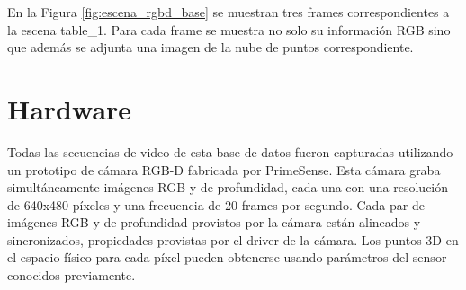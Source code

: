 En la Figura \ref{fig:escena_rgbd_base} se muestran tres frames correspondientes a la escena table\_1. Para cada frame se muestra no solo su información RGB sino que además se adjunta una imagen de la nube de puntos correspondiente.


\section{Hardware}
Todas las secuencias de video de esta base de datos fueron capturadas utilizando un prototipo de cámara RGB-D fabricada por PrimeSense. Esta cámara graba simultáneamente imágenes RGB y de profundidad, cada una con una resolución de 640x480 píxeles y una frecuencia de 20 frames por segundo. Cada par de imágenes RGB y de profundidad provistos por la cámara están alineados y sincronizados, propiedades provistas por el driver de la cámara. Los puntos 3D en el espacio físico para cada píxel pueden obtenerse usando parámetros del sensor conocidos previamente.
